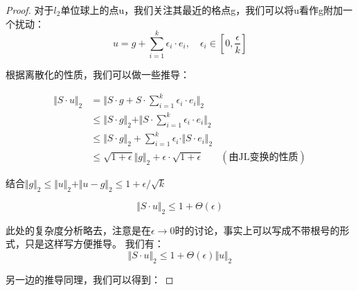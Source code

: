 \documentclass[lang=cn,newtx,10pt,scheme=chinese,chinesefont=nofont,citestyle=gb7714-2015, bibstyle=gb7714-2015]{elegantbook}
\begin{document}
\begin{refsection}
\begin{proof}
    对于$l_2$单位球上的点u，我们关注其最近的格点g，我们可以将u看作g附加一个扰动：
    $$
    u = g + \sum_{i=1}^{k} \epsilon_i\cdot e_i,\quad \epsilon_i \in [0, \frac{\epsilon}{k}]
    $$



\begin{center}
\end{center}

根据离散化的性质，我们可以做一些推导：

\begin{align*}
    \Vert S\cdot u \Vert_2 &= \Vert S\cdot g + S\cdot \sum_{i=1}^{k} \epsilon_i\cdot e_i \Vert_2 \\
    &\le \Vert S\cdot g \Vert_2 + \Vert S\cdot \sum_{i=1}^{k} \epsilon_i\cdot e_i \Vert_2 \\
    &\le \Vert S\cdot g \Vert_2 + \sum_{i=1}^{k} \epsilon_i\cdot \Vert S\cdot e_i \Vert_2 \\
    &\le\sqrt{1+\epsilon} \Vert g\Vert_2 + \epsilon\cdot\sqrt{1+\epsilon} &(\text{由JL变换的性质})
\end{align*}

结合$\Vert g \Vert_2\le \Vert u \Vert_2 + \Vert u-g \Vert_2 \le 1 + \epsilon/ \sqrt{k}$

$$
\Vert S\cdot u\Vert_2 \le 1+\Theta(\epsilon)
$$

此处的复杂度分析略去，注意是在$\epsilon\rightarrow 0$时的讨论，事实上可以写成不带根号的形式，只是这样写方便推导。
我们有：
$$
\Vert S\cdot u\Vert_2 \le 1+\Theta(\epsilon)\Vert u\Vert_2
$$

另一边的推导同理，我们可以得到：


\end{proof}
\end{refsection}
\end{document}
